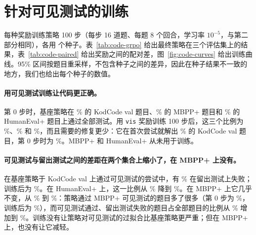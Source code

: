 
\section{针对可见测试的训练}\label{sec:res-grpo}

每种奖励训练策略 100 步（每步 16 道题、每题 8 个回合，学习率 $10^{-5}$，与第二部分相同），各用  个种子。表~\ref{tab:code-grpo} 给出最终策略在三个评估集上的结果，表~\ref{tab:code-paired} 给出奖励之间的配对差，图~\ref{fig:code-curves} 给出训练曲线。95\% 区间按题目重采样，不包含种子之间的差异，因此在种子结果不一致的地方，我们也给出每个种子的数值。

\paragraph{用可见测试训练让代码更正确。} 第 0 步时，基座策略在 \% 的 KodCode val 题目、\% 的 MBPP+ 题目和 \% 的 HumanEval+ 题目上通过全部测试。用 \texttt{vis} 奖励训练 100 步后，这三个比例为 \%、\% 和 \%，而且需要的修复更少：它在首次尝试就解出 \% 的 KodCode val 题目，第 0 步时为 \%。MBPP+ 和 HumanEval+ 从未用于训练。

\paragraph{可见测试与留出测试之间的差距在两个集合上缩小了，在 MBPP+ 上没有。} 在基座策略于 KodCode val 上通过可见测试的尝试中，有 \% 在留出测试上失败；训练后为 \%。在 HumanEval+ 上，这一比例从 \% 降到 \%。在 MBPP+ 上它几乎不变，从 \% 到 \%：策略通过 MBPP+ 可见测试的题目多了很多（第 0 步为 \%，训练后为 \%），而可见测试通过、留出测试失败的题目占全部题目的比例从 \% 增加到 \%。训练没有让策略对可见测试的过拟合比基座策略更严重；但在 MBPP+ 上，也没有让它减轻。

\begin{table}[t]
\centering\small

\caption{最终策略（贪心解码，最多三次尝试）：通过可见测试（\emph{vis}）、通过全部测试（\emph{all}），以及通过可见测试但有留出测试失败（\emph{hack}）的题目比例（\%）；种子均值。}
\label{tab:code-grpo}
\end{table}

